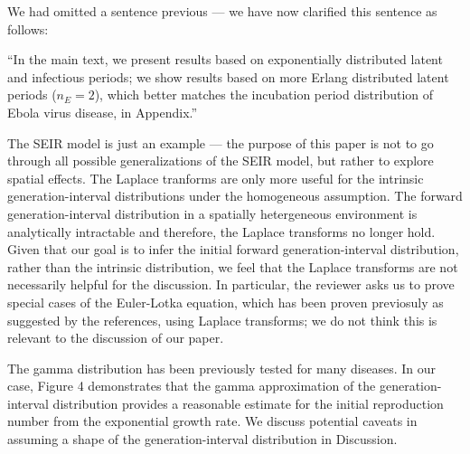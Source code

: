 
We had omitted a sentence previous --- we have now clarified this sentence as follows:

``In the main text, we present results based on exponentially distributed latent and infectious periods;
we show results based on more Erlang distributed latent periods ($n_E=2$), which better matches the incubation period distribution of Ebola virus disease, in Appendix.''


The SEIR model is just an example --- the purpose of this paper is not to go through all possible generalizations of the SEIR model, but rather to explore spatial effects.
The Laplace tranforms are only more useful for the intrinsic generation-interval distributions under the homogeneous assumption. 
The forward generation-interval distribution in a spatially hetergeneous environment is analytically intractable and therefore, the Laplace transforms no longer hold.
Given that our goal is to infer the initial forward generation-interval distribution, rather than the intrinsic distribution, we feel that the Laplace transforms are not necessarily helpful for the discussion.
In particular, the reviewer asks us to prove special cases of the Euler-Lotka equation, which has been proven previosuly as suggested by the references, using Laplace transforms; 
we do not think this is relevant to the discussion of our paper.


The gamma distribution has been previously tested for many diseases. 
In our case, Figure 4 demonstrates that the gamma approximation of the generation-interval distribution provides a reasonable estimate for the initial reproduction number from the exponential growth rate.
We discuss potential caveats in assuming a shape of the generation-interval distribution in Discussion.

